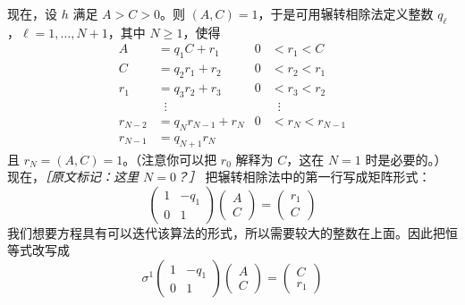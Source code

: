 现在，设 $h$ 满足 $A>C>0$。则 $(A,C)=1$，于是可用辗转相除法定义整数 $q_\ell$，$\ell=1,\dots,N+1$，其中 $N\ge1$，使得
\begin{equation}
  \begin{aligned}
    A&=q_1C+r_1 & 0&<r_1<C\\
    C&=q_2r_1+r_2 & 0&<r_2<r_1\\
    r_1&=q_3r_2+r_3 & 0&<r_3<r_2\\
    &\;\;\vdots & &\;\;\vdots\\
    r_{N-2}&=q_Nr_{N-1}+r_N & 0&<r_N<r_{N-1}\\
    r_{N-1}&=q_{N+1}r_N & &
  \end{aligned}
  \tag{C.16}
  \label{eq:C.16}
\end{equation}
且 $r_N=(A,C)=1$。（注意你可以把 $r_0$ 解释为 $C$，这在 $N=1$ 时是必要的。）现在，{\small\itshape ［原文标记：这里 $N=0$？］}
把辗转相除法中的第一行写成矩阵形式：
\begin{equation}
  \begin{pmatrix}
    1 & -q_1\\
    0 & 1
  \end{pmatrix}\begin{pmatrix}
    A\\
    C
  \end{pmatrix}=\begin{pmatrix}
    r_1\\
    C
  \end{pmatrix}
  \tag{C.17}
  \label{eq:C.17}
\end{equation}
我们想要方程具有可以迭代该算法的形式，所以需要较大的整数在上面。因此把恒等式改写成
\begin{equation}
  \sigma^1\begin{pmatrix}
    1 & -q_1\\
    0 & 1
  \end{pmatrix}\begin{pmatrix}
    A\\
    C
  \end{pmatrix}=\begin{pmatrix}
    C\\
    r_1
  \end{pmatrix}
  \tag{C.18}
  \label{eq:C.18}
\end{equation}

